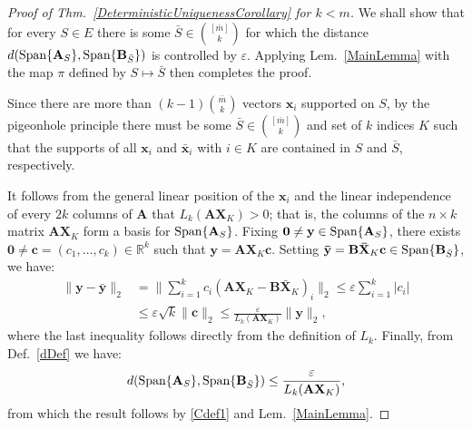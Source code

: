 \documentclass[9pt,twocolumn]{pnas-new}
\begin{document}
\begin{proof}[Proof of Thm.~\ref{DeterministicUniquenessCorollary} for $k < m$] 
We shall show that for every $S \in E$ there is some $\bar S \in {[\bar m] \choose k}$ for which the distance $d(\text{\rm Span}\{\mathbf{A}_S\}, \text{\rm Span}\{\mathbf{B}_{\bar S}\})$ is controlled by $\varepsilon$. Applying Lem.~\ref{MainLemma} with the map $\pi$ defined by $S \mapsto \bar S$ then completes the proof.  

Since there are more than $(k-1){\bar m \choose k}$ vectors $\mathbf{x}_i$ supported on $S$, by the pigeonhole principle there must be some $\bar S \in {[\bar m] \choose k}$ and set of $k$ indices $K$ such that the supports of all $\mathbf{x}_i$ and $\mathbf{\bar x}_i$ with $i \in K$ are contained in $S$ and $\bar S$, respectively.


It follows from the general linear position of the $\mathbf{x}_i$ and the linear independence of every $2k$ columns of $\mathbf{A}$ that $L_k(\mathbf{AX}_{K}) > 0$; that is, the columns of the $n \times k$ matrix $\mathbf{AX}_K$ form a basis for $\text{\rm Span}\{\mathbf{A}_{S}\}$. Fixing $\mathbf{0} \neq \mathbf{y} \in \text{\rm Span}\{\mathbf{A}_{S}\}$, there exists $\mathbf{0} \neq \mathbf{c} = (c_1, \ldots, c_k) \in \mathbb{R}^k$ such that $\mathbf{y} = \mathbf{AX}_K\mathbf{c}$. Setting \mbox{$\mathbf{\bar{y}} = \mathbf{B\bar{X}}_K\mathbf{c} \in \text{\rm Span}\{\mathbf{B}_{\bar S}\}$}, we have:
\begin{align*}
\|\mathbf{y} - \mathbf{\bar{y}}\|_2 
&= \|\sum_{i=1}^k c_i(\mathbf{AX}_K - \mathbf{B\bar{X}}_K)_i\|_2
\leq \varepsilon \sum_{i=1}^k |c_i| \\
&\leq \varepsilon \sqrt{k}  \|\mathbf{c}\|_2 
\leq \frac{\varepsilon}{L_k(\mathbf{AX}_K)} \|\mathbf{y}\|_2,
\end{align*}
where the last inequality follows directly from the definition of $L_k$. Finally, from Def.~\ref{dDef} we have:
\begin{align}\label{rhs222}
d(\text{\rm Span}\{\mathbf{A}_S\}, \text{\rm Span}\{\mathbf{B}_{\bar S}\}) 
\leq \frac{\varepsilon}{  L_k(\mathbf{AX}_{K}) },
\end{align}
%
from which the result follows by \eqref{Cdef1} and Lem.~\ref{MainLemma}.
\end{proof}
\end{document}
